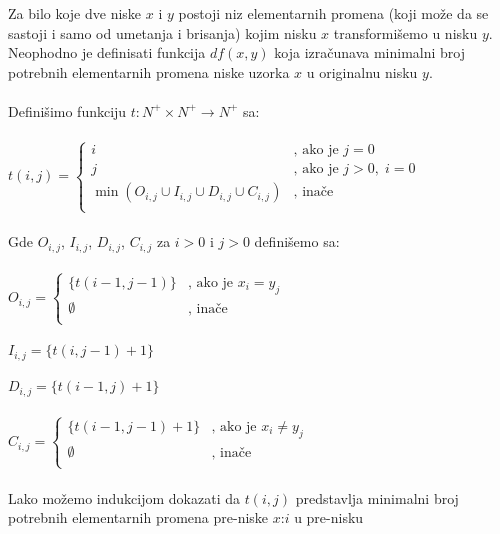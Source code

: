     Za bilo koje dve niske $x$ i $y$ postoji niz elementarnih promena
    (koji mo\v{z}e da se sastoji i samo od umetanja i brisanja) kojim nisku
    $x$ transformi\v{s}emo u nisku $y$.
    Neophodno je definisati funkcija $df(x,y)$ koja izra\v{c}unava
    minimalni broj potrebnih elementarnih promena niske uzorka $x$ u
    originalnu nisku $y$.\\
    \\
    Defini\v{s}imo funkciju $t\colon N^+\times N^+\to N^+$ sa:\\
    \\
    $t(i,j)=
    \left\{
    \begin{array}{ll}
      i                                                 & \mbox{, ako je } j=0\\
      j                                                 & \mbox{, ako je } j>0,\;i=0\\
      \min(O_{i,j}\cup I_{i,j}\cup D_{i,j}\cup C_{i,j}) & \mbox{, ina\v{c}e}\\
    \end{array}
    \right.$\\
    \\
    Gde $O_{i,j}$, $I_{i,j}$, $D_{i,j}$, $C_{i,j}$ za $i>0$ i $j>0$
    defini\v{s}emo sa:\\
    \\
    $O_{i,j}=
    \left\{
      \begin{array}{ll}
        \{t(i-1,j-1)\} & \mbox{, ako je } x_i=y_j\\
        \emptyset      & \mbox{, ina\v{c}e}\\
      \end{array}
    \right.$\\
    \\
    $I_{i,j}=\{t(i,j-1)+1\}$\\
    \\
    $D_{i,j}=\{t(i-1,j)+1\}$\\
    \\
    $C_{i,j}=
    \left\{
      \begin{array}{ll}
        \{t(i-1,j-1)+1\} & \mbox{, ako je } x_i\ne y_j\\
        \emptyset        & \mbox{, ina\v{c}e}\\
      \end{array}
    \right.$\\
    \\
    Lako mo\v{z}emo indukcijom dokazati da $t(i,j)$ predstavlja minimalni
    broj potre\-bnih elementarnih promena pre-niske $x$:$i$ u pre-nisku
